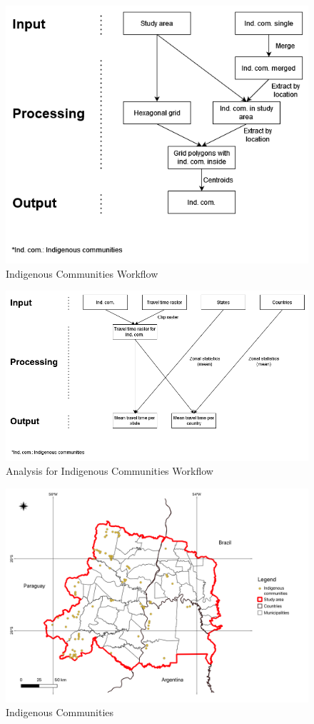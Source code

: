 \documentclass[11pt, a4paper]{report}
\begin{document}
\begin{figure}[H]
  \centering
  \includegraphics[width=0.9\linewidth]{figures/indcomworkflow.png}
  \caption{Indigenous Communities Workflow}
  \label{fig:indcomworkflow}
\end{figure}

\begin{figure}[H]
  \centering
  \includegraphics[width=0.9\linewidth]{figures/icanalysisworkflow.png}
  \caption{Analysis for Indigenous Communities Workflow}
  \label{fig:analysisindcomworkflow}
\end{figure}

\begin{figure}[H]
  \centering
  \includegraphics[width=0.9\linewidth]{figures/Indigenous Communities.png}
  \caption{Indigenous Communities}
  \label{fig:indigcom}
\end{figure}
    
\end{document}
